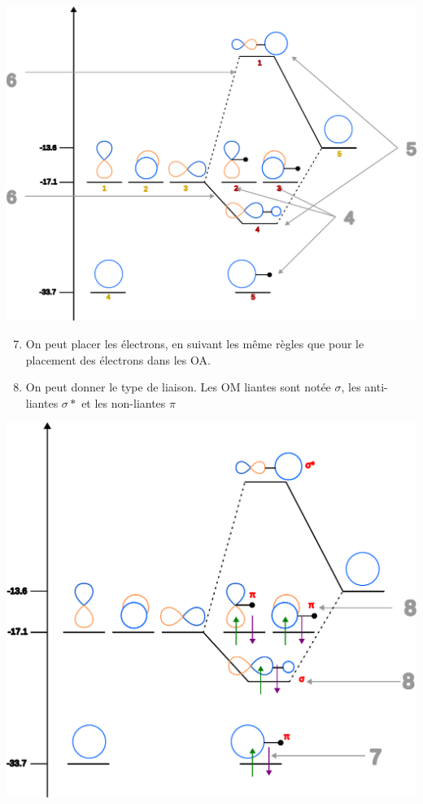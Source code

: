 \documentclass[french]{yLectureNote}
\begin{document}
\includegraphics[scale=0.5]{DOM2}
\begin{enumerate}
\setcounter{enumi}{6}
 \item On peut placer les électrons, en suivant les m\^eme règles que pour le placement des électrons dans les OA.
 \item On peut donner le type de liaison. Les OM liantes sont notée $\sigma$, les anti-liantes $\sigma *$ et les non-liantes $\pi$
\end{enumerate}
\includegraphics[scale=0.5]{DOM3}
\end{document}
